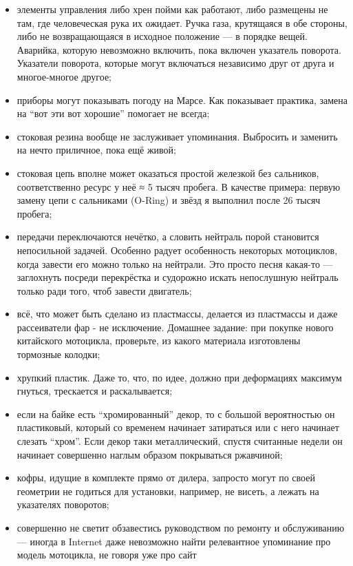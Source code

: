 \documentclass[12pt,a4paper]{article}
\begin{document}
\begin{itemize}
\item элементы управления либо хрен пойми как работают, либо размещены
не там, где человеческая рука их ожидает. Ручка газа, крутящаяся в обе
стороны, либо не возвращающаяся в исходное положение --- в порядке
вещей. Аварийка, которую невозможно включить, пока включен указатель
поворота. Указатели поворота, которые могут включаться независимо друг
от друга и многое-многое другое;
\item приборы могут показывать погоду на Марсе. Как показывает
практика, замена на ``вот эти вот хорошие'' помогает не всегда;
\item стоковая резина вообще не заслуживает упоминания. Выбросить
и заменить на нечто приличное, пока ещё живой;
\item стоковая цепь вполне может оказаться простой железкой без сальников,
соответственно ресурс у неё ≈ 5 тысяч пробега. В качестве примера:
первую замену цепи с сальниками (O-Ring) и звёзд я выполнил после 26 тысяч
пробега;
\item передачи переключаются нечётко, а словить нейтраль порой
становится непосильной задачей. Особенно радует особенность некоторых
мотоциклов, когда завести его можно только на нейтрали. Это просто
песня какая-то --- заглохнуть посреди перекрёстка и судорожно
искать непослушную нейтраль только ради того, чтоб завести двигатель;
\item всё, что может быть сделано из пластмассы, делается из пластмассы
и даже рассеиватели фар - не исключение. Домашнее задание: при покупке
нового китайского мотоцикла, проверьте, из какого материала изготовлены
тормозные колодки;
\item хрупкий пластик. Даже то, что, по идее, должно при деформациях
максимум гнуться, трескается и раскалывается;
\item если на байке есть ``хромированный'' декор, то с большой
вероятностью он пластиковый, который со временем начинает затираться
или с него начинает слезать ``хром''. Если декор таки металлический,
спустя считанные недели он начинает совершенно наглым образом
покрываться ржавчиной;
\item кофры, идущие в комплекте прямо от дилера, запросто могут по
своей геометрии не годиться для установки, например, не висеть, а
лежать на указателях поворотов;
\item совершенно не светит обзавестись руководством по ремонту и
обслуживанию --- иногда в Internet даже невозможно найти
релевантное упоминание про модель мотоцикла, не говоря уже про сайт

\end{itemize}
\end{document}
